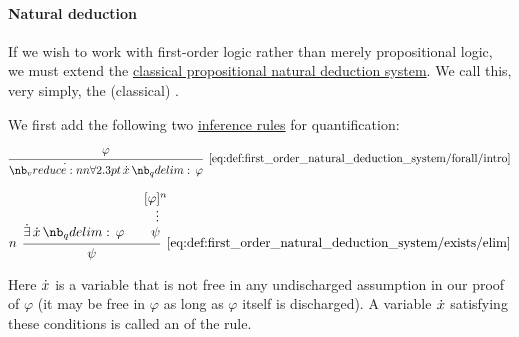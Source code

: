\paragraph{Natural deduction}

\begin{definition}\label{def:first_order_natural_deduction_system}
  If we wish to work with first-order logic rather than merely propositional logic, we must extend the \hyperref[def:propositional_natural_deduction_systemss]{classical propositional natural deduction system}. We call this, very simply, the (classical) .

  \begin{thmenum}
     We first add the following two \hyperref[con:judgment/inference_rule]{inference rules} for quantification:

    \begin{minipage}{0.45\textwidth}
      \begin{equation*}\taglabel[\( \synforall^+ \)]{eq:def:first_order_natural_deduction_system/forall/intro}
        \begin{prooftree}
          \hypo{ \varphi }
          \infer1[\ref{eq:def:first_order_natural_deduction_system/forall/intro}]{ \qforall \synx \varphi }
        \end{prooftree}
      \end{equation*}
    \end{minipage}
    \hfill
    \begin{minipage}{0.45\textwidth}
      \begin{equation*}\taglabel[\( \synexists^- \)]{eq:def:first_order_natural_deduction_system/exists/elim}
        \begin{prooftree}
          \hypo{ \qexists \synx \varphi }
          \hypo{ [\varphi]^n }
          \ellipsis {} { \psi }
          \infer[left label=\( n \)]2[\ref{eq:def:first_order_natural_deduction_system/exists/elim}]{ \psi }
        \end{prooftree}
      \end{equation*}
    \end{minipage}

    Here \( {\dot{x}} \) is a variable that is not free in any undischarged assumption in our proof of \( \varphi \) (it may be free in \( \varphi \) as long as \( \varphi \) itself is discharged). A variable \( {\dot{x}} \) satisfying these conditions is called an  of the rule.


\end{thmenum}
\end{definition}
